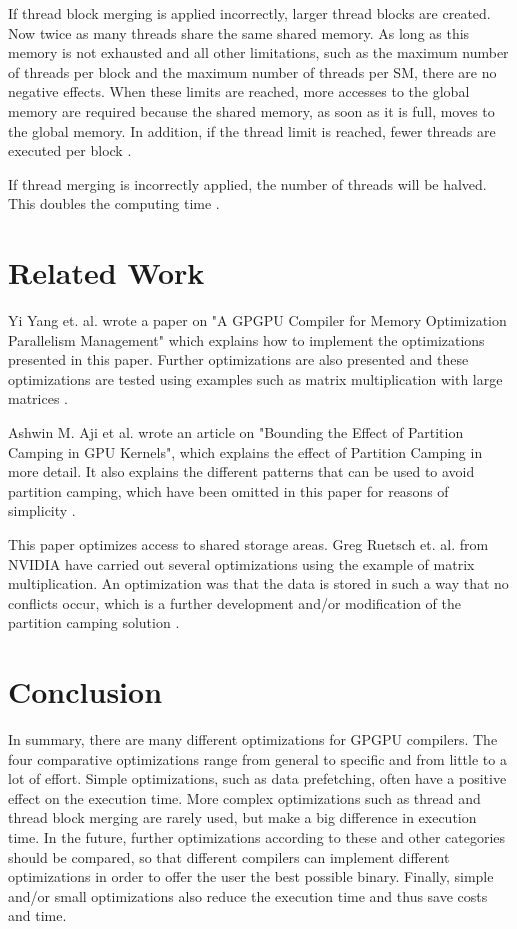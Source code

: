 \documentclass[conference]{IEEEtran}
\begin{document}
		If thread block merging is applied incorrectly, larger thread blocks are created. Now twice as many threads share the same shared memory. As long as this memory is not exhausted and all other limitations, such as the maximum number of threads per block and the maximum number of threads per SM, there are no negative effects. When these limits are reached, more accesses to the global memory are required because the shared memory, as soon as it is full, moves to the global memory. In addition, if the thread limit is reached, fewer threads are executed per block \cite{torres2011understanding}.
		
		If thread merging is incorrectly applied, the number of threads will be halved. This doubles the computing time \cite{torres2011understanding}. 

	
	
\section{Related Work}

	Yi Yang et. al. wrote a paper on "A GPGPU Compiler for Memory Optimization Parallelism Management" which explains how to implement the optimizations presented in this paper. Further optimizations are also presented and these optimizations are tested using examples such as matrix multiplication with large matrices \cite{yang2010gpgpu}.
	
	Ashwin M. Aji et al. wrote an article on "Bounding the Effect of Partition Camping in GPU Kernels", which explains the effect of Partition Camping in more detail. It also explains the different patterns that can be used to avoid partition camping, which have been omitted in this paper for reasons of simplicity \cite{aji2011bounding}.  
	
	This paper optimizes access to shared storage areas.  Greg Ruetsch et. al. from NVIDIA have carried out several optimizations using the example of matrix multiplication. An optimization was that the data is stored in such a way that no conflicts occur, which is a further development and/or modification of the partition camping solution \cite{ruetsch2009optimizing}.
	
\section{Conclusion}

	In summary, there are many different optimizations for GPGPU compilers. The four comparative optimizations range from general to specific and from little to a lot of effort. Simple optimizations, such as data prefetching, often have a positive effect on the execution time. More complex optimizations such as thread and thread block merging are rarely used, but make a big difference in execution time.  In the future, further optimizations according to these and other categories should be compared, so that different compilers can implement different optimizations in order to offer the user the best possible binary. Finally, simple and/or small optimizations also reduce the execution time and thus save costs and time.
	




\end{document}
